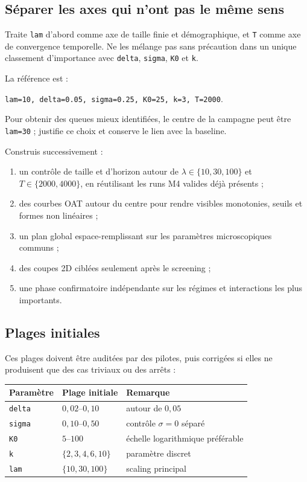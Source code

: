 \documentclass[11pt,a4paper]{article}
\newcommand{\code}[1]{\texttt{\color{navy}#1}}
\begin{document}
\subsection{Séparer les axes qui n'ont pas le même sens}

Traite \code{lam} d'abord comme axe de taille finie et démographique, et
\code{T} comme axe de convergence temporelle. Ne les mélange pas sans
précaution dans un unique classement d'importance avec \code{delta},
\code{sigma}, \code{K0} et \code{k}.

La référence est :

\begin{center}
\code{lam=10, delta=0.05, sigma=0.25, K0=25, k=3, T=2000}.
\end{center}

Pour obtenir des queues mieux identifiées, le centre de la campagne peut être
\code{lam=30} ; justifie ce choix et conserve le lien avec la baseline.

Construis successivement :

\begin{enumerate}
  \item un contrôle de taille et d'horizon autour de
    $\lambda\in\{10,30,100\}$ et $T\in\{2000,4000\}$, en réutilisant les
    runs M4 valides déjà présents ;
  \item des courbes OAT autour du centre pour rendre visibles monotonies,
    seuils et formes non linéaires ;
  \item un plan global espace-remplissant sur les paramètres microscopiques
    communs ;
  \item des coupes 2D ciblées seulement après le screening ;
  \item une phase confirmatoire indépendante sur les régimes et interactions
    les plus importants.
\end{enumerate}

\subsection{Plages initiales}

Ces plages doivent être auditées par des pilotes, puis corrigées si elles ne
produisent que des cas triviaux ou des arrêts :

\begin{center}
\begin{tabular}{@{}lll@{}}
\toprule
\textbf{Paramètre} & \textbf{Plage initiale} & \textbf{Remarque} \\
\midrule
\code{delta} & $0{,}02$--$0{,}10$ & autour de $0{,}05$ \\
\code{sigma} & $0{,}10$--$0{,}50$ & contrôle $\sigma=0$ séparé \\
\code{K0} & $5$--$100$ & échelle logarithmique préférable \\
\code{k} & $\{2,3,4,6,10\}$ & paramètre discret \\
\code{lam} & $\{10,30,100\}$ & scaling principal \\
\bottomrule
\end{tabular}
\end{center}
\end{document}
